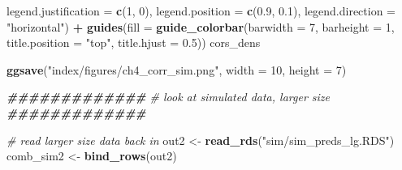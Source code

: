 \documentclass[12pt, twoside]{amherstthesis}
\newenvironment{Shaded}{\begin{snugshade}}{\end{snugshade}}
\newcommand{\AttributeTok}[1]{\textcolor[rgb]{0.13,0.29,0.53}{#1}}
\newcommand{\CommentTok}[1]{\textcolor[rgb]{0.56,0.35,0.01}{\textit{#1}}}
\newcommand{\DecValTok}[1]{\textcolor[rgb]{0.00,0.00,0.81}{#1}}
\newcommand{\DocumentationTok}[1]{\textcolor[rgb]{0.56,0.35,0.01}{\textbf{\textit{#1}}}}
\newcommand{\FloatTok}[1]{\textcolor[rgb]{0.00,0.00,0.81}{#1}}
\newcommand{\FunctionTok}[1]{\textcolor[rgb]{0.13,0.29,0.53}{\textbf{#1}}}
\newcommand{\NormalTok}[1]{#1}
\newcommand{\OtherTok}[1]{\textcolor[rgb]{0.56,0.35,0.01}{#1}}
\newcommand{\SpecialCharTok}[1]{\textcolor[rgb]{0.81,0.36,0.00}{\textbf{#1}}}
\newcommand{\StringTok}[1]{\textcolor[rgb]{0.31,0.60,0.02}{#1}}
\begin{document}
\begin{Shaded}
\begin{Highlighting}[]
        \AttributeTok{legend.justification =} \FunctionTok{c}\NormalTok{(}\DecValTok{1}\NormalTok{, }\DecValTok{0}\NormalTok{),}
        \AttributeTok{legend.position =} \FunctionTok{c}\NormalTok{(}\FloatTok{0.9}\NormalTok{, }\FloatTok{0.1}\NormalTok{),}
        \AttributeTok{legend.direction =} \StringTok{"horizontal"}\NormalTok{) }\SpecialCharTok{+}
  \FunctionTok{guides}\NormalTok{(}\AttributeTok{fill =} \FunctionTok{guide\_colorbar}\NormalTok{(}\AttributeTok{barwidth =} \DecValTok{7}\NormalTok{, }\AttributeTok{barheight =} \DecValTok{1}\NormalTok{,}
                               \AttributeTok{title.position =} \StringTok{"top"}\NormalTok{, }\AttributeTok{title.hjust =} \FloatTok{0.5}\NormalTok{))}
\NormalTok{cors\_dens}

\FunctionTok{ggsave}\NormalTok{(}\StringTok{"index/figures/ch4\_corr\_sim.png"}\NormalTok{, }\AttributeTok{width =} \DecValTok{10}\NormalTok{, }\AttributeTok{height =} \DecValTok{7}\NormalTok{)}
\end{Highlighting}
\end{Shaded}
\normalsize

\scriptsize
\begin{Shaded}
\begin{Highlighting}[]
\DocumentationTok{\#\#\#\#\#\#\#\#\#\#\#\#\#}
\CommentTok{\# look at simulated data, larger size}
\DocumentationTok{\#\#\#\#\#\#\#\#\#\#\#\#\#}

\CommentTok{\# read larger size data back in}
\NormalTok{out2 }\OtherTok{\textless{}{-}} \FunctionTok{read\_rds}\NormalTok{(}\StringTok{"sim/sim\_preds\_lg.RDS"}\NormalTok{)}
\NormalTok{comb\_sim2 }\OtherTok{\textless{}{-}} \FunctionTok{bind\_rows}\NormalTok{(out2)}
\end{Highlighting}
\end{Shaded}
\normalsize
\end{document}
